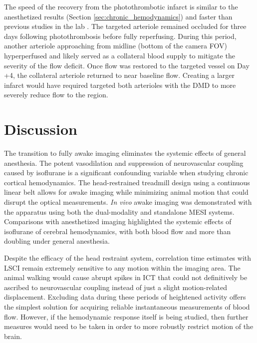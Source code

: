 The speed of the recovery from the photothrombotic infarct is similar to the anesthetized results (Section \ref{sec:chronic_hemodynamics}) and faster than previous studies in the lab \cite{Schrandt:2015gu}. The targeted arteriole remained occluded for three days following photothrombosis before fully reperfusing. During this period, another arteriole approaching from midline (bottom of the camera FOV) hyperperfused and likely served as a collateral blood supply to mitigate the severity of the flow deficit. Once flow was restored to the targeted vessel on Day +4, the collateral arteriole returned to near baseline flow. Creating a larger infarct would have required targeted both arterioles with the DMD to more severely reduce flow to the region.



\section{Discussion}

The transition to fully awake imaging eliminates the systemic effects of general anesthesia. The potent vasodilation \cite{Iida:1998th} and suppression of neurovascular coupling \cite{Pisauro:2013cx} caused by isoflurane is a significant confounding variable when studying chronic cortical hemodynamics. The head-restrained treadmill design using a continuous linear belt allows for awake imaging while minimizing animal motion that could disrupt the optical measurements. \textit{In vivo} awake imaging was demonstrated with the apparatus using both the dual-modality and standalone MESI systems. Comparisons with anesthetized imaging highlighted the systemic effects of isoflurane of cerebral hemodynamics, with both blood flow and  more than doubling under general anesthesia.

Despite the efficacy of the head restraint system, correlation time estimates with LSCI remain extremely sensitive to any motion within the imaging area. The animal walking would cause abrupt spikes in ICT that could not definitively be ascribed to neurovascular coupling instead of just a slight motion-related displacement. Excluding data during these periods of heightened activity offers the simplest solution for acquiring reliable instantaneous measurements of blood flow. However, if the hemodynamic response itself is being studied, then further measures would need to be taken in order to more robustly restrict motion of the brain.

